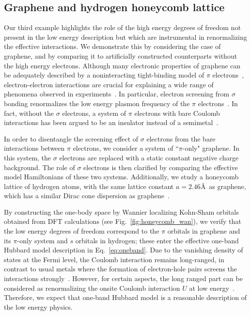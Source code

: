 \subsection{Graphene and hydrogen honeycomb lattice}
\label{subsection:graphene}
Our third example highlights the role of the high energy 
degrees of freedom not present in the low energy description 
but which are instrumental in renormalizing the effective interactions. 
We demonstrate this by considering the case of graphene, and by 
comparing it to artificially constructed counterparts without the high energy electrons. 
Although many electronic properties of graphene can be adequately 
described by a noninteracting tight-binding model of $\pi$ electrons~\cite{Castro2009}, 
electron-electron interactions are crucial for explaining 
a wide range of phenomena observed in experiments~\cite{Kotov2012}. 
In particular, electron screening from $\sigma$ bonding renormalizes 
the low energy plasmon frequency of the $\pi$ electrons~\cite{Zheng2016}. In fact, 
without the $\sigma$ electrons, a system of $\pi$ electrons with bare Coulomb interactions has been argued  to be an 
insulator instead of a semimetal~\cite{DrutPRL2009, DrutPRB2009,  Smith2014, Zheng2016}. 

In order to disentangle the screening effect of $\sigma$ electrons from the bare interactions 
between $\pi$ electrons, we consider a system of ``$\pi$-only" graphene.  
In this system, the 
$\sigma$ electrons are replaced with a static constant negative charge background. 
The role of $\sigma$ electrons is then clarified by comparing the effective model Hamiltonians of these two systems. 
Additionally, we study a honeycomb lattice of hydrogen atoms, with the same lattice constant $a=2.46$\AA~as graphene, 
which has a similar Dirac cone dispersion as graphene~\cite{Zheng2016}. 

By constructing the one-body space by Wannier localizing Kohn-Sham orbitals obtained from DFT calculations (see Fig.~\ref{fig:honeycomb_wan}), 
we verify that the low energy degrees of freedom correspond to the $\pi$ orbitals in graphene and 
its $\pi$-only system and $s$ orbitals in hydrogen; these enter the effective one-band Hubbard model description in Eq.~\eqref{eq:oneband}. 
Due to the vanishing density of states at the Fermi level, the Coulomb interaction remains long-ranged, 
in contrast to usual metals where the formation of electron-hole pairs screens the interactions strongly~\cite{Zheng2016}. 
However, for certain aspects, the long ranged part can be considered as renormalizing the 
onsite Coulomb interaction $U$ at low energy~\cite{Schuler2013, Changlani2015}. 
Therefore, we expect that one-band Hubbard model is a reasonable description of the low energy physics. 

